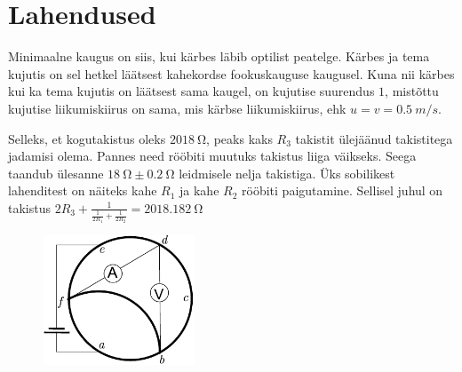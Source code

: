 \documentclass[10pt]{article}
\begin{document}
\hint

\probend
\bigskip
\newpage\section{Lahendused}
        \toggleSolution
        

\solu
Minimaalne kaugus on siis, kui kärbes läbib optilist peatelge. Kärbes ja tema kujutis on sel hetkel läätsest kahekordse fookuskauguse kaugusel. Kuna nii kärbes kui ka tema kujutis on läätsest sama kaugel, on kujutise suurendus $1$, mistõttu kujutise liikumiskiirus on sama, mis kärbse liikumiskiirus, ehk $u = v = \SI{0,5}{m/s}$.
\probend
\bigskip


\solu
Selleks, et kogutakistus oleks $\SI{2018}{\ohm}$, peaks kaks $R_3$ takistit ülejäänud takistitega jadamisi olema. Pannes need rööbiti muutuks takistus liiga väikseks. Seega taandub ülesanne $\SI{18}{\ohm}\pm\SI{0.2}{\ohm}$ leidmisele nelja takistiga. Üks sobilikest lahenditest on näiteks kahe $R_1$ ja kahe $R_2$ rööbiti paigutamine. Sellisel juhul on takistus $2R_3 + \frac{1}{\frac{1}{2R_1} + \frac{1}{2R_2}} = \SI{2018.182}{\ohm}$
\probend
\bigskip


\solu
\begin{figure}
	\vspace{-20pt}
	\begin{center}
		\includegraphics[width = 0.4\textwidth]{2018-lahg-03-yl.pdf}
	\end{center}
\end{figure}
\end{document}
